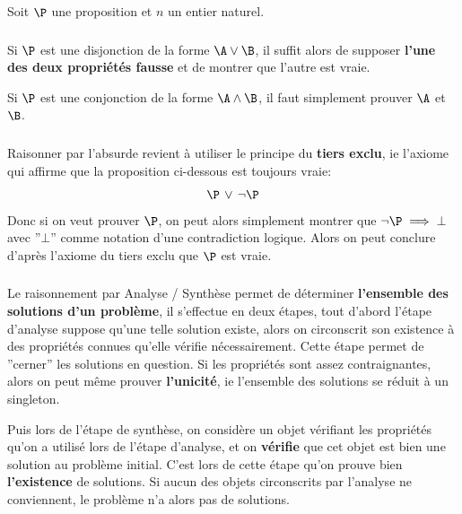 \chapter*{}
Soit \(\P\) une proposition et \(n\) un entier naturel.

\subsection*{}
Si \(\P\) est une disjonction de la forme \(\A \lor \B\), il suffit alors de supposer \textbf{l'une des deux propriétés fausse} et de montrer que l'autre est vraie.\<

Si \(\P\) est une conjonction de la forme \(\A \land \B\), il faut simplement prouver \(\A\) et \(\B\).
\subsection*{}
Raisonner par l'absurde revient à utiliser le principe du \textbf{tiers exclu}, ie l'axiome qui affirme que la proposition ci-dessous est toujours vraie:
\[
   \P \, \lor \, \lnot \P
\]
Donc si on veut prouver \(\P\), on peut alors simplement montrer que \(\lnot\P \implies \bot\) avec ''\(\bot\)'' comme notation d'une contradiction logique. Alors on peut conclure d'après l'axiome du tiers exclu que \(\P\) est vraie. 
\subsection*{}
Le raisonnement par Analyse / Synthèse permet de déterminer \textbf{l'ensemble des solutions d'un problème}, il s'effectue en deux étapes, tout d'abord l'étape d'analyse suppose qu'une telle solution existe, alors on circonscrit son existence à des propriétés connues qu'elle vérifie nécessairement. Cette étape permet de ''cerner'' les solutions en question. Si les propriétés sont assez contraignantes, alors on peut même prouver \textbf{l'unicité}, ie l'ensemble des solutions se réduit à un singleton.\<

Puis lors de l'étape de synthèse, on considère un objet vérifiant les propriétés qu'on a utilisé lors de l'étape d'analyse, et on \textbf{vérifie} que cet objet est bien une solution au problème initial. C'est lors de cette étape qu'on prouve bien \textbf{l'existence} de solutions. Si aucun des objets circonscrits par l'analyse ne conviennent, le problème n'a alors pas de solutions.
